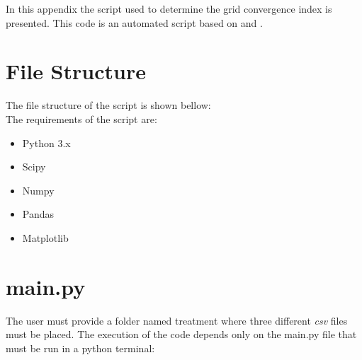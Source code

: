 \noindent
In this appendix the script used to determine the grid convergence index is presented. This code is an automated script based on \textcite{celik2008} and \textcite{Dutta2018}.
\section{File Structure}
\noindent
The file structure of the script is shown bellow:
\\
\noindent
The requirements of the script are:
\begin{itemize}
\item Python 3.x
\item Scipy
\item Numpy
\item Pandas
\item Matplotlib
\end{itemize}
\section{main.py}
The user must provide a folder named treatment where three different \textit{csv} files must be placed. The execution of the code depends only on the main.py file that must be run in a python terminal:

